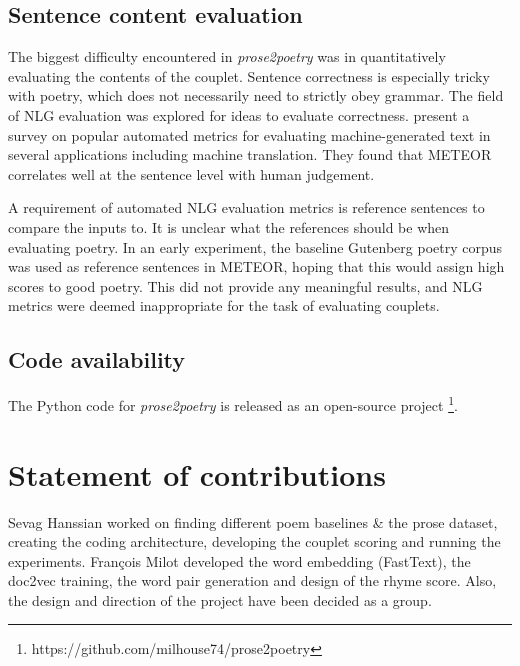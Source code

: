 \documentclass[11pt,a4paper]{article}
\begin{document}
\subsection{Sentence content evaluation}
\label{sec:nlg}

The biggest difficulty encountered in \textit{prose2poetry} was in quantitatively evaluating the contents of the couplet. Sentence correctness is especially tricky with poetry, which does not necessarily need to strictly obey grammar. The field of NLG evaluation was explored for ideas to evaluate correctness. \citet{nlgeval} present a survey on popular automated metrics for evaluating machine-generated text in several applications including machine translation. They found that METEOR \cite{meteor} correlates well at the sentence level with human judgement.

A requirement of automated NLG evaluation metrics is reference sentences to compare the inputs to. It is unclear what the references should be when evaluating poetry. In an early experiment, the baseline Gutenberg poetry corpus was used as reference sentences in METEOR, hoping that this would assign high scores to good poetry. This did not provide any meaningful results, and NLG metrics were deemed inappropriate for the task of evaluating couplets.

\subsection{Code availability}

The Python code for \textit{prose2poetry} is released as an open-source project \footnote{https://github.com/milhouse74/prose2poetry}.

\section{Statement of contributions}
\label{sec:contributions}
Sevag Hanssian worked on finding different poem baselines \& the prose dataset, creating the coding architecture, developing the couplet scoring and running the experiments. François Milot developed the word embedding (FastText), the doc2vec training, the word pair generation and design of the rhyme score. Also, the design and direction of the project have been decided as a group. 

\vfill
\clearpage %



\end{document}
